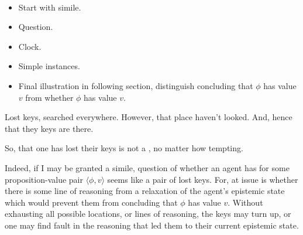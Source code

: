 \paragraph{}
\label{sec:ideaS:illus}

\begin{note}
  \begin{itemize}
  \item Start with simile.
  \item Question.
  \item Clock.
  \item Simple instances.
  \item Final illustration in following section, distinguish concluding that \(\phi\) has value \(v\) from whether \(\phi\) has value \(v\).
\end{itemize}
\end{note}

\begin{note}
  \begin{illustration}
    Lost keys, searched everywhere.
    However, \epVAd{} that place haven't looked.
    And, hence \epVAd{} that they keys are there.
  \end{illustration}
  So, that one has lost their keys is not a \sink{}, no matter how tempting.

  Indeed, if I may be granted a simile, question of whether an agent has \support{} for some proposition-value pair \(\langle \phi, v \rangle\) seems like a pair of lost keys.
  For, at issue is whether there is some line of reasoning from a relaxation of the agent's epistemic state which would prevent them from concluding that \(\phi\) has value \(v\).
  Without exhausting all possible locations, or lines of reasoning, the keys may turn up, or one may find fault in the reasoning that led them to their current epistemic state.
\end{note}

